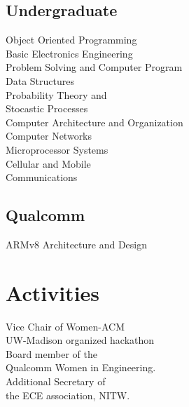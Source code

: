 \documentclass[letterpaper]{deedy-resume} %
\begin{document}
\begin{minipage}[t]{0.23\textwidth}
\vspace{-3 mm}
\subsection{Undergraduate}
\textbullet{} Object Oriented Programming\\
\textbullet{} Basic Electronics Engineering \\
\textbullet{} Problem Solving and Computer Program \\
\textbullet{} Data Structures \\
\textbullet{} Probability Theory and \\ \hphantom{\textbullet{}} Stocastic Processes \\
\textbullet{} Computer Architecture and Organization \\
\textbullet{} Computer Networks \\
\textbullet{} Microprocessor Systems \\
\textbullet{} Cellular and Mobile \\ \hphantom{\textbullet{}} Communications \\

\vspace{-1 mm}
\subsection{Qualcomm}
\textbullet{} ARMv8 Architecture and Design \\

\vspace{-5 mm}
\section{Activities}
\footnotesize{
\textbullet[2016]{} Vice Chair of Women-ACM \\ \hphantom{\textbullet{}} UW-Madison organized hackathon\\
\textbullet[2015]{} Board member of the \\ \hphantom{\textbullet{}}Qualcomm Women in Engineering. \\
\textbullet[2012]{} Additional Secretary of \\ \hphantom{\textbullet{}} the ECE association, NITW. \\
}


\hfill
\end{minipage} %
\end{document}
